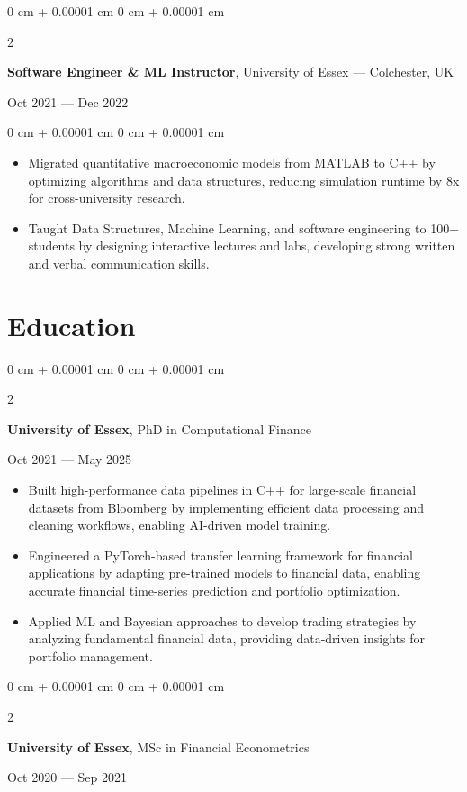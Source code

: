 \documentclass[6pt, letterpaper]{article}
\newenvironment{highlights}{
    \begin{itemize}[
        topsep=0.03 cm,
        parsep=0.03 cm,
        partopsep=0pt,
        itemsep=0pt,
        leftmargin=0 cm + 10pt
    ]
}{
    \end{itemize}
} %
\newenvironment{onecolentry}{
    \begin{adjustwidth}{
        0 cm + 0.00001 cm
    }{
        0 cm + 0.00001 cm
    }
}{
    \end{adjustwidth}
} %
\newenvironment{twocolentry}[2][]{
    \onecolentry
    \def\secondColumn{#2}
    \setcolumnwidth{\fill, 4.5 cm}
    \begin{paracol}{2}
}{
    \switchcolumn \raggedleft \secondColumn
    \end{paracol}
    \endonecolentry
} %
\begin{document}
        \begin{twocolentry}{Oct 2021 --- Dec 2022}
        \textbf{Software Engineer \& ML Instructor}, University of Essex --- Colchester, UK
        \end{twocolentry}

        \begin{onecolentry}
        \begin{highlights}
        \item Migrated quantitative macroeconomic models from MATLAB to C++ by optimizing algorithms and data structures, reducing simulation runtime by 8x for cross-university research.
        \item Taught Data Structures, Machine Learning, and software engineering to 100+ students by designing interactive lectures and labs, developing strong written and verbal communication skills.
        \end{highlights}
        \end{onecolentry}

    \section{Education}

            \begin{twocolentry}{
                Oct 2021 --- May 2025
            }
            \textbf{University of Essex}, PhD in Computational Finance
            \end{twocolentry}

            \begin{highlights}
            \item Built high-performance data pipelines in C++ for large-scale financial datasets from Bloomberg by implementing efficient data processing and cleaning workflows, enabling AI-driven model training.
            \item Engineered a PyTorch-based transfer learning framework for financial applications by adapting pre-trained models to financial data, enabling accurate financial time-series prediction and portfolio optimization.
            \item Applied ML and Bayesian approaches to develop trading strategies by analyzing fundamental financial data, providing data-driven insights for portfolio management.
            \end{highlights}

            \begin{twocolentry}{
                Oct 2020 --- Sep 2021
            }
            \textbf{University of Essex}, MSc in Financial Econometrics
            \end{twocolentry}
\end{document}
